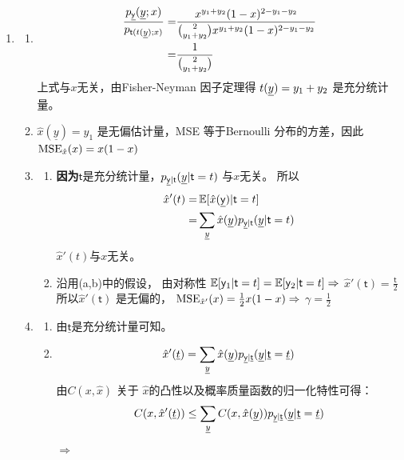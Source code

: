\documentclass[a4paper]{article}
\begin{document}
\begin{enumerate}[label=\thehwcnt.\arabic*.]
  \setlength{\itemsep}{3\parskip}

  \item 
    \begin{enumerate}[label=(\alph*)]
  \item 
  \begin{align*}
  \frac{p_{\underline{\mathsf{y}}}(\underline{y};x)}{p_{\mathsf{t}(t(\underline{y});x)}} = & \frac{x^{y_1+y_2}(1-x)^{2-y_1-y_2}}{\binom{2}{y_1+y_2}x^{y_1+y_2}(1-x)^{2-y_1-y_2}} \\
  = & \frac{1}{\binom{2}{y_1+y_2}}
  \end{align*}
  上式与$x$无关，由Fisher-Neyman 因子定理得 $t(\underline{y})=y_1+y_2$ 是充分统计量。
  \item $\hat{x}(\underline{y})=y_1$ 是无偏估计量，MSE 等于Bernoulli 分布的方差，因此
  $\operatorname{MSE}_{\hat{x}}(x)=x(1-x)$
  \item   
    \begin{enumerate}[label=\roman*.]
  \item \textbf{因为}$\mathsf{t}$是充分统计量，$p_{\underline{\mathsf{y}}| \mathsf{t}}(\underline{y}|\mathsf{t}=t)$ 与$x$无关。
  所以
  \begin{align*}
     \hat{x}'(t) = & \operatorname{\mathbb{E}}[\hat{x}(\underline{\mathsf{y}})|\mathsf{t}=t] \\
     = &\sum_{\underline{y}} \hat{x}(\underline{y}) p_{\underline{\mathsf{y}}| \mathsf{t}}(\underline{y}|\mathsf{t}=t)
  \end{align*}
  $\hat{x}'(t)$与$x$无关。
  \item
  沿用(a,b)中的假设，
  由对称性 $\operatorname{\mathbb{E}}[\mathsf{y}_1|\mathsf{t}=t]=\operatorname{\mathbb{E}}[\mathsf{y}_2|\mathsf{t}=t] \Rightarrow$
    $\hat{x}'(\mathsf{t})=\frac{\mathsf{t}}{2}$
    所以$\hat{x}'(\mathsf{t})$ 是无偏的，
    $\operatorname{MSE}_{\hat{x}'}(x)=\frac{1}{2}x(1-x)\Rightarrow$
    $\gamma=\frac{1}{2}$  
   \end{enumerate}
  \item 
    \begin{enumerate}[label=\roman*.]
    \item 由$\underline{\mathsf{t}}$是充分统计量可知。
    \item 
    \[
     \hat{x}'(\underline{t}) =  \sum_{\underline{y}} \hat{x}(\underline{y}) p_{\underline{\mathsf{y}}| \underline{\mathsf{t}}}(\underline{y}|\underline{\mathsf{t}}=\underline{t})
    \]
    由$C(x,\hat{x})$ 关于 $\hat{x}$的凸性以及概率质量函数的归一化特性可得：
    \[
    C(x,\hat{x}'(\underline{t})) \leq  \sum_{\underline{y}} C(x,\hat{x}(\underline{y})) p_{\underline{\mathsf{y}}| \underline{\mathsf{t}}}(\underline{y}|\underline{\mathsf{t}}=\underline{t})
    \]
    $\Rightarrow$
    \begin{equation}\label{eq:61Mid}

\end{equation}
\end{enumerate}
\end{enumerate}
\end{enumerate}
\end{document}
